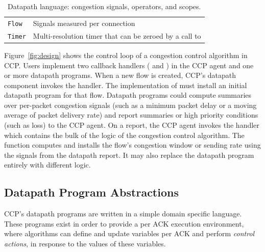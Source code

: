 \begin{table}
\begin{tabular}{@{} p{}p{}}
        \texttt{Flow} & Signals measured per connection \\
        \texttt{Timer} & Multi-resolution timer that can be zeroed by a call to \ct{reset} \\
    \end{tabular}
    \caption{Datapath language: congestion signals, operators, and scopes.}\label{tab:api}
\end{table}

Figure~\ref{fig:design} shows the control loop of a congestion control algorithm in CCP.
Users implement two callback handlers ( and ) in the CCP agent
and one or more datapath programs.
When a new flow is created, CCP's datapath component invokes the  handler.
The implementation of  must install an initial datapath program for that flow.
%
Datapath programs could compute summaries over per-packet
congestion signals (such as a minimum packet delay or a moving average of packet
delivery rate) and report summaries or high priority conditions
(such as loss) to the CCP agent.
On a report, the CCP agent invokes the  handler
which contains the bulk of the logic of the congestion control algorithm.
The  function computes and installs the flow's congestion
window or sending rate using the signals from the datapath report.
It may also replace the datapath program entirely with different logic.

\subsection{Datapath Program Abstractions}
\label{s:ccp:datapath_programs}
CCP's datapath programs are written in a simple domain specific language.
These programs exist in order to provide a per ACK execution environment, where algorithms can define and update variables per ACK and perform \textit{control actions}, in response to the values of these variables.

